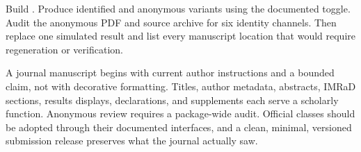 
\chapterproject

\begin{miniproject}
Build . Produce identified and
anonymous variants using the documented toggle. Audit the anonymous PDF and
source archive for six identity channels. Then replace one simulated result and
list every manuscript location that would require regeneration or verification.
\end{miniproject}

\chaptersummary

A journal manuscript begins with current author instructions and a bounded
claim, not with decorative formatting. Titles, author metadata, abstracts,
IMRaD sections, results displays, declarations, and supplements each serve a
scholarly function. Anonymous review requires a package-wide audit. Official
classes should be adopted through their documented interfaces, and a clean,
minimal, versioned submission release preserves what the journal actually saw.

